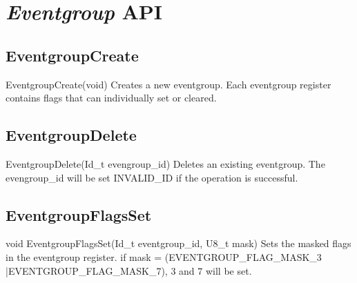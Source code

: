 \section{\textit{Eventgroup} API}

\subsection{EventgroupCreate}
\label{func:EventgroupCreate}
\begin{pdfunction}
{EventgroupCreate(void) }
{ 
Creates a new eventgroup. Each eventgroup register contains 
flags that can individually set or cleared. }
\end{pdfunction}

\subsection{EventgroupDelete}
\label{func:EventgroupDelete}
\begin{pdfunction}
{EventgroupDelete(Id\_t evengroup\_id) }
{ 
Deletes an existing eventgroup. The evengroup\_id will be set 
INVALID\_ID if the operation is successful. }
\end{pdfunction}

\subsection{EventgroupFlagsSet}
\label{func:EventgroupFlagsSet}
\begin{pdfunction}
{void EventgroupFlagsSet(Id\_t eventgroup\_id, U8\_t mask) }
{ 
Sets the masked flags in the eventgroup register. 
if mask = (EVENTGROUP\_FLAG\_MASK\_3 |EVENTGROUP\_FLAG\_MASK\_7), 
3 and 7 will be set. }
\end{pdfunction}

